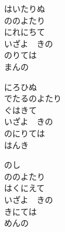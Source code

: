 \documentclass[10pt,b5j]{tarticle} %
\begin{document}
\vspace{1.5em} %
\newcommand{\linespace}{0.5em} %
\newcommand{\blocksize}{0.5\hsize} %
\begin{enumerate} %
    \begin{minipage}[c]{\blocksize}
    
        \vspace{\linespace}
        \item
        はいたりぬ\\
        ののよたり\\
        にれにちて\\
        いざよ　きの\\
        のりては\\
        まんの
        
        \vspace{\linespace}
        \item
        にろひぬ\\
        でたるのよたり\\
        ぐはきて\\
        いざよ　きの\\
        のにりては\\
        はんき
        
        \vspace{\linespace}
        \item
        のし\\
        ののよたり\\
        はくにえて\\
        いざよ　きの\\
        きにては\\
        めんの
    
    \end{minipage}
\end{enumerate} %
\end{document}
